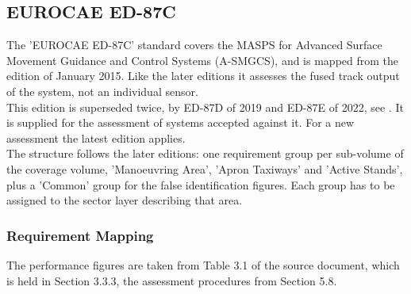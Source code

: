 \subsection{EUROCAE ED-87C}
\label{sec:appendix_eval_std_ed87c}

The 'EUROCAE ED-87C' standard covers the MASPS for Advanced Surface Movement Guidance and Control Systems (A-SMGCS), and is mapped from the edition of January 2015. Like the later editions it assesses the fused track output of the system, not an individual sensor. \\

This edition is superseded twice, by ED-87D of 2019 and ED-87E of 2022, see . It is supplied for the assessment of systems accepted against it. For a new assessment the latest edition applies. \\

The structure follows the later editions: one requirement group per sub-volume of the coverage volume, 'Manoeuvring Area', 'Apron Taxiways' and 'Active Stands', plus a 'Common' group for the false identification figures. Each group has to be assigned to the sector layer describing that area. \\

\subsubsection{Requirement Mapping}

The performance figures are taken from Table 3.1 of the source document, which is held in Section 3.3.3, the assessment procedures from Section 5.8.

